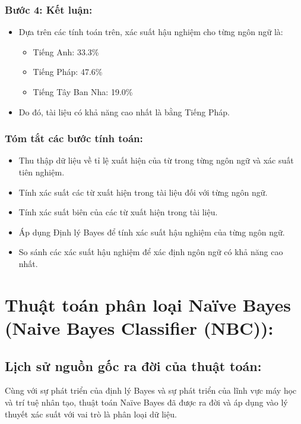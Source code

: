 \begin{itemize}
        \subsubsection{ Bước 4: Kết luận:}
        \begin{itemize}
            \item  Dựa trên các tính toán trên, xác suất hậu nghiệm cho từng ngôn ngữ là:
        \begin{itemize}
            \item Tiếng Anh: 33.3\%
            \item Tiếng Pháp: 47.6\%
            \item Tiếng Tây Ban Nha: 19.0\%
        \end{itemize}
            \item Do đó, tài liệu có khả năng cao nhất là bằng Tiếng Pháp.
        \end{itemize}
        \subsubsection{ Tóm tắt các bước tính toán:}
        \begin{itemize}
            \item Thu thập dữ liệu về tỉ lệ xuất hiện của từ trong từng ngôn ngữ và xác suất tiên nghiệm.
            \item Tính xác suất các từ xuất hiện trong tài liệu đối với từng ngôn ngữ.
            \item Tính xác suất biên của các từ xuất hiện trong tài liệu.
            \item Áp dụng Định lý Bayes để tính xác suất hậu nghiệm của từng ngôn ngữ.
            \item So sánh các xác suất hậu nghiệm để xác định ngôn ngữ có khả năng cao nhất.
        \end{itemize}
     

\end{itemize}

\section{Thuật toán phân loại Naïve Bayes (Naive Bayes Classifier (NBC)):}

\subsection{Lịch sử nguồn gốc ra đời của thuật toán:}

Cùng với sự phát triển của định lý Bayes và sự phát triển của lĩnh vực máy học và trí tuệ nhân tạo, thuật toán Naïve Bayes đã được ra đời và áp dụng vào lý thuyết xác suất với vai trò là phân loại dữ liệu.

